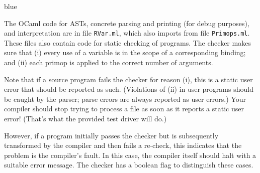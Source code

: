 \documentclass[11pt]{book}
\newenvironment{ocamlx}{
  \begin{color}{blue}
}
{
  \end{color}
}
\begin{document}
\begin{ocamlx}
  The OCaml code for \LangVar{} ASTs, concrete parsing and printing (for debug purposes),
  and interpretation are in file \texttt{RVar.ml}, which also imports
  from file \texttt{Primops.ml}.  These files also contain code for
  static checking of \LangVar{} programs. The checker makes sure that
  (i) every use of a variable is in the scope of a corresponding  binding;
  and (ii) each primop is applied to the correct number of arguments.

  Note that if a source program fails the checker for reason (i), this is a static user error
  that should be reported as such. (Violations of (ii) in user programs
  should be caught by the parser; parse errors are always reported as user errors.)
  Your compiler should stop trying to process a file as soon as it reports a static user
  error! (That's what the provided test driver will do.)

  However, if a program initially passes
  the checker but is subsequently transformed by the compiler and then
  fails a re-check, this indicates that the problem is the compiler's fault.
  In this case, the compiler itself should halt with a suitable error message.
  The checker has a boolean flag to distinguish these cases.
\end{ocamlx}
\end{document}
